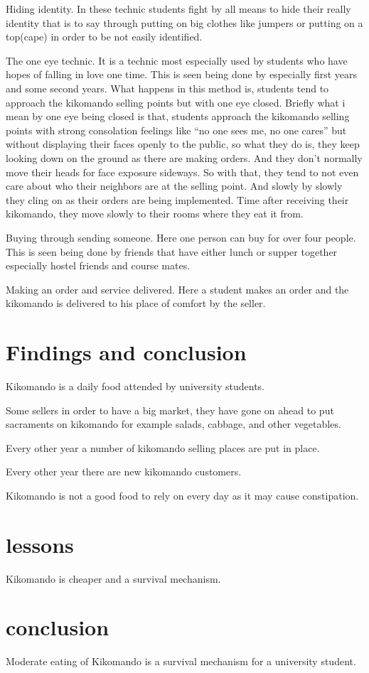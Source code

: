 \documentclass{article}
\begin{document}
{Hiding identity. In these technic students fight by all means to hide their really identity that is to say through putting on big clothes like jumpers or putting on a top(cape) in order to be not easily identified.
}

{The one eye technic.
It is a technic most especially used by students who have hopes of falling in love one time. This is seen being done by especially first years and some second years. What happens in this method is, students tend to approach the kikomando selling points but with one eye closed. Briefly what i mean by one eye being closed is that, students approach the kikomando selling points with strong consolation feelings like “no one sees me, no one cares” but without displaying their faces openly to the public, so what they do is, they keep looking down on the ground as there are making orders. And they don’t normally move their heads for face exposure sideways. So with that, they tend to not even care about who their neighbors are at the selling point. And slowly by slowly they cling on as their orders are being implemented. Time after receiving their kikomando, they move slowly to their rooms where they eat it from.
}

{Buying through sending someone. Here one person can buy for over four people. This is seen being done by friends that have either lunch or supper together especially hostel friends and course mates.
}

{Making an order and service delivered. Here a student makes an order and the kikomando is delivered to his place of comfort by the seller. 
}
\section{Findings and conclusion}{Kikomando is a daily food attended by university students.
}

{Some sellers in order to have a big market, they have gone on ahead to put sacraments on kikomando for example salads, cabbage, and other vegetables.}

{Every other year a number of kikomando selling places are put in place.}

{Every other year there are new kikomando customers.}

{Kikomando is not a good food to rely on every day as it may cause constipation.}

\section{lessons}{Kikomando is cheaper and a survival mechanism.}
\section{conclusion}{Moderate eating of Kikomando is a survival mechanism for a university student.
}
\end{document}
